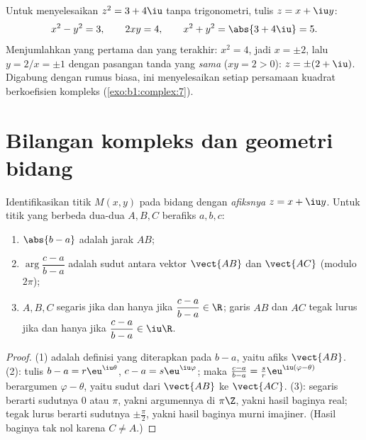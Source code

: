 \begin{example}\label{ex:b1:complex:sqrt}
Untuk menyelesaikan $z^2 = 3 + 4\iu$ tanpa trigonometri, tulis $z = x + \iu y$:
\[
x^2 - y^2 = 3, \qquad 2xy = 4, \qquad x^2 + y^2 = \abs{3 + 4\iu} = 5 .
\]
Menjumlahkan yang pertama dan yang terakhir: $x^2 = 4$, jadi $x = \pm 2$, lalu $y = 2/x =
\pm 1$ dengan pasangan tanda yang \emph{sama} ($xy = 2 > 0$): $z = \pm(2 +
\iu)$. Digabung dengan rumus biasa, ini menyelesaikan setiap persamaan
kuadrat berkoefisien kompleks
(\cref{exo:b1:complex:7}).
\end{example}

\section{Bilangan kompleks dan geometri bidang}

\begin{proposition}\label{prop:b1:complex:geometry}
Identifikasikan titik $M(x, y)$ pada bidang dengan \emph{afiksnya} $z = x
+ \iu y$. Untuk titik yang berbeda dua-dua $A, B, C$ berafiks $a, b,
c$:
\begin{enumerate}
  \item $\abs{b - a}$ adalah jarak $AB$;
  \item $\arg\dfrac{c - a}{b - a}$ adalah sudut antara vektor
        $\vect{AB}$ dan $\vect{AC}$ (modulo $2\pi$);
  \item $A, B, C$ segaris jika dan hanya jika $\dfrac{c - a}{b - a} \in
        \R$; garis $AB$ dan $AC$ tegak lurus jika dan hanya jika
        $\dfrac{c - a}{b - a} \in \iu\R$.
\end{enumerate}
\end{proposition}

\begin{proof}
(1) adalah definisi  yang diterapkan pada $b - a$, yaitu afiks
$\vect{AB}$. (2): tulis $b - a = r\eu^{\iu\theta}$, $c - a =
s\eu^{\iu\varphi}$; maka $\frac{c-a}{b-a} = \frac sr
\eu^{\iu(\varphi - \theta)}$ berargumen $\varphi - \theta$, yaitu
sudut dari $\vect{AB}$ ke $\vect{AC}$. (3): segaris berarti sudutnya $0$
atau $\pi$, yakni argumennya di $\pi\Z$, yakni hasil baginya real;
tegak lurus berarti sudutnya $\pm\frac\pi2$, yakni hasil baginya
murni imajiner. (Hasil baginya tak nol karena $C \neq A$.)
\end{proof}

